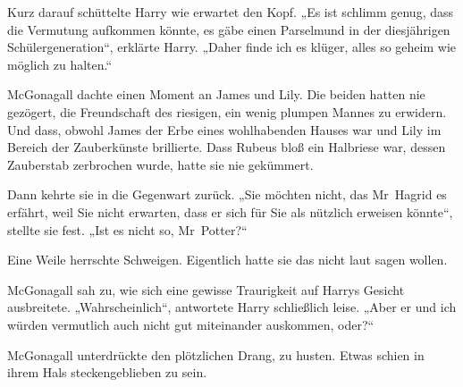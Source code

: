 Kurz darauf schüttelte Harry wie erwartet den Kopf. „Es ist schlimm genug, dass die Vermutung aufkommen könnte, es gäbe einen Parselmund in der diesjährigen Schülergeneration“, erklärte Harry. „Daher finde ich es klüger, alles so geheim wie möglich zu halten.“

McGonagall dachte einen Moment an James und Lily. Die beiden hatten nie gezögert, die Freundschaft des riesigen, ein wenig plumpen Mannes zu erwidern. Und dass, obwohl James der Erbe eines wohlhabenden Hauses war und Lily im Bereich der Zauberkünste brillierte. Dass Rubeus bloß ein Halbriese war, dessen Zauberstab zerbrochen wurde, hatte sie nie gekümmert.

Dann kehrte sie in die Gegenwart zurück. „Sie möchten nicht, das Mr~Hagrid es erfährt, weil Sie nicht erwarten, dass er sich für Sie als nützlich erweisen könnte“, stellte sie fest. „Ist es nicht so, Mr~Potter?“

Eine Weile herrschte Schweigen. Eigentlich hatte sie das nicht laut sagen wollen.

McGonagall sah zu, wie sich eine gewisse Traurigkeit auf Harrys Gesicht ausbreitete. „Wahrscheinlich“, antwortete Harry schließlich leise. „Aber er und ich würden vermutlich auch nicht gut miteinander auskommen, oder?“

McGonagall unterdrückte den plötzlichen Drang, zu husten. Etwas schien in ihrem Hals steckengeblieben zu sein.

